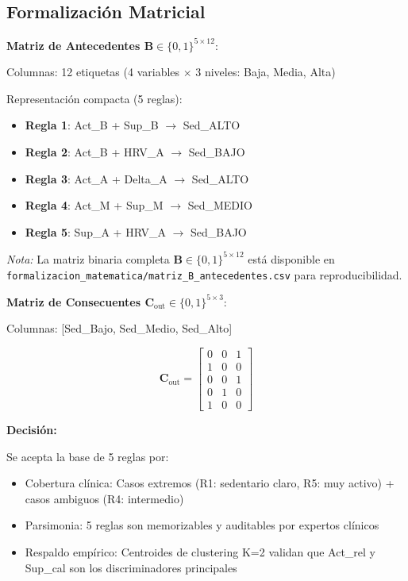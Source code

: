 \documentclass[12pt,letterpaper,twoside]{report}
\newcommand{\mat}[1]{\mathbf{#1}}
\begin{document}
\subsection{Formalización Matricial}

\begin{calculobox}
\textbf{Matriz de Antecedentes $\mat{B} \in \{0,1\}^{5 \times 12}$}:

Columnas: 12 etiquetas (4 variables $\times$ 3 niveles: Baja, Media, Alta)

Representación compacta (5 reglas):
\begin{itemize}[noitemsep]
    \item \textbf{Regla 1}: Act\_B + Sup\_B $\to$ Sed\_ALTO
    \item \textbf{Regla 2}: Act\_B + HRV\_A $\to$ Sed\_BAJO
    \item \textbf{Regla 3}: Act\_A + Delta\_A $\to$ Sed\_ALTO
    \item \textbf{Regla 4}: Act\_M + Sup\_M $\to$ Sed\_MEDIO
    \item \textbf{Regla 5}: Sup\_A + HRV\_A $\to$ Sed\_BAJO
\end{itemize}

\textit{Nota:} La matriz binaria completa $\mat{B} \in \{0,1\}^{5 \times 12}$ está disponible en \texttt{formalizacion\_matematica/matriz\_B\_antecedentes.csv} para reproducibilidad.

\textbf{Matriz de Consecuentes $\mat{C}_{\text{out}} \in \{0,1\}^{5 \times 3}$}:

Columnas: [Sed\_Bajo, Sed\_Medio, Sed\_Alto]

\begin{equation*}
\mat{C}_{\text{out}} = 
\begin{bmatrix}
0 & 0 & 1 \\
1 & 0 & 0 \\
0 & 0 & 1 \\
0 & 1 & 0 \\
1 & 0 & 0
\end{bmatrix}
\end{equation*}
\end{calculobox}

\begin{decisionbox}
\textbf{Decisión:}

Se acepta la base de 5 reglas por:
\begin{itemize}[noitemsep]
    \item Cobertura clínica: Casos extremos (R1: sedentario claro, R5: muy activo) + casos ambiguos (R4: intermedio)
    \item Parsimonia: 5 reglas son memorizables y auditables por expertos clínicos
    \item Respaldo empírico: Centroides de clustering K=2 validan que Act\_rel y Sup\_cal son los discriminadores principales
\end{itemize}
\end{decisionbox}
\end{document}
